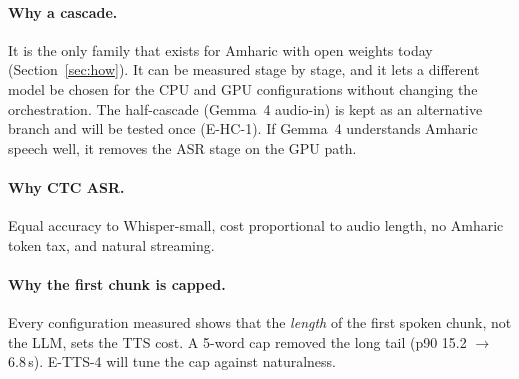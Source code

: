 \paragraph{Why a cascade.} It is the only family that exists for Amharic with open weights today
(Section~\ref{sec:how}). It can be measured stage by stage, and it lets a different model be chosen for the
CPU and GPU configurations without changing the orchestration. The half-cascade (Gemma~4 audio-in) is
kept as an alternative branch and will be tested once (E-HC-1). If Gemma~4 understands Amharic speech
well, it removes the ASR stage on the GPU path.

\paragraph{Why CTC ASR.} Equal accuracy to Whisper-small, cost proportional to audio length, no
Amharic token tax, and natural streaming.

\paragraph{Why the first chunk is capped.} Every configuration measured shows that the \emph{length} of
the first spoken chunk, not the LLM, sets the TTS cost. A 5-word cap removed the long tail
(p90 15.2 $\rightarrow$ 6.8\,s). E-TTS-4 will tune the cap against naturalness.
